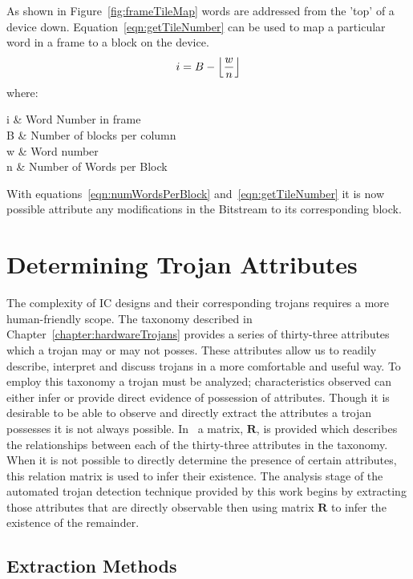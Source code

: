 \normalsize
As shown in Figure~\ref{fig:frameTileMap} words are addressed from the 'top' of a device down.
Equation~\ref{eqn:getTileNumber} can be used to map a particular word in a frame to a block on the device.
\begin{equation} \label{eqn:getTileNumber}
i = B - \floor*{\frac{w}{n}}
\end{equation}
\ConditionSize
where:
\begin{conditions}
	i     &  Word Number in frame\\
	B     &  Number of blocks per column \\
	w     &  Word number \\
	n     &  Number of Words per Block 
\end{conditions}
\normalsize
With equations~\ref{eqn:numWordsPerBlock} and~\ref{eqn:getTileNumber} it is now possible attribute any modifications in the \gls{Bitstream} to its corresponding block.

\section{Determining Trojan Attributes} \label{sec:trojanAttributes}
The complexity of \acrlong{IC} designs and their corresponding trojans requires a more human-friendly scope.
The taxonomy described in Chapter~\ref{chapter:hardwareTrojans} provides a series of thirty-three attributes which a trojan may or may not posses.
These attributes allow us to readily describe, interpret and discuss trojans in a more comfortable and useful way.
To employ this taxonomy a trojan must be analyzed; characteristics observed can either infer or provide direct evidence of possession of attributes. 
Though it is desirable to be able to observe and directly extract the attributes a trojan possesses it is not always possible. 
In~\cite{samerAttribute} a matrix, $\mathbf{R}$, is provided which describes the relationships between each of the thirty-three attributes in the taxonomy.
When it is not possible to directly determine the presence of certain attributes, this relation matrix is used to infer their existence.
The analysis stage of the automated trojan detection technique provided by this work begins by extracting those attributes that are directly observable then using matrix $\mathbf{R}$ to infer the existence of the remainder. 
\subsection{Extraction Methods} \label{sec:directExtractionMethods}
